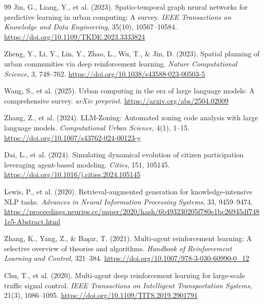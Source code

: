 \documentclass[final,3p,times]{elsarticle}
\begin{document}
\begin{thebibliography}{99}
Jin, G., Liang, Y., et al. (2023). Spatio-temporal graph neural networks for predictive learning in urban computing: A survey. \textit{IEEE Transactions on Knowledge and Data Engineering}, 35(10), 10567--10584. \href{https://doi.org/10.1109/TKDE.2023.3333824}{https://doi.org/10.1109/TKDE.2023.3333824}

Zheng, Y., Li, Y., Lin, Y., Zhao, L., Wu, T., \& Jin, D. (2023). Spatial planning of urban communities via deep reinforcement learning. \textit{Nature Computational Science}, 3, 748--762. \href{https://doi.org/10.1038/s43588-023-00503-5}{https://doi.org/10.1038/s43588-023-00503-5}

Wang, S., et al. (2025). Urban computing in the era of large language models: A comprehensive survey. \textit{arXiv preprint}. \href{https://arxiv.org/abs/2504.02009}{https://arxiv.org/abs/2504.02009}

Zhang, Z., et al. (2024). LLM-Zoning: Automated zoning code analysis with large language models. \textit{Computational Urban Science}, 4(1), 1--15. \href{https://doi.org/10.1007/s43762-024-00123-y}{https://doi.org/10.1007/s43762-024-00123-y}

Dai, L., et al. (2024). Simulating dynamical evolution of citizen participation leveraging agent-based modeling. \textit{Cities}, 151, 105145. \href{https://doi.org/10.1016/j.cities.2024.105145}{https://doi.org/10.1016/j.cities.2024.105145}

Lewis, P., et al. (2020). Retrieval-augmented generation for knowledge-intensive NLP tasks. \textit{Advances in Neural Information Processing Systems}, 33, 9459--9474. \href{https://proceedings.neurips.cc/paper/2020/hash/6b493230205f780e1bc26945df7481e5-Abstract.html}{https://proceedings.neurips.cc/paper/2020/hash/6b493230205f780e1bc26945df7481e5-Abstract.html}

Zhang, K., Yang, Z., \& Ba\c{s}ar, T. (2021). Multi-agent reinforcement learning: A selective overview of theories and algorithms. \textit{Handbook of Reinforcement Learning and Control}, 321--384. \href{https://doi.org/10.1007/978-3-030-60990-0_12}{https://doi.org/10.1007/978-3-030-60990-0\_12}

Chu, T., et al. (2020). Multi-agent deep reinforcement learning for large-scale traffic signal control. \textit{IEEE Transactions on Intelligent Transportation Systems}, 21(3), 1086--1095. \href{https://doi.org/10.1109/TITS.2019.2901791}{https://doi.org/10.1109/TITS.2019.2901791}


\end{thebibliography}
\end{document}
